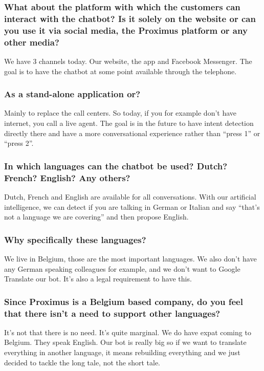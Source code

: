 \begin{appendices}
	\subsubsection{What about the platform with which the customers can interact with the chatbot? Is it solely on the website or can you use it via social media, the Proximus platform or any other media?}
	We have 3 channels today. Our website, the app and Facebook Messenger. The goal is to have the chatbot at some point available through the telephone.
	
	\subsubsection{As a stand-alone application or?}
	Mainly to replace the call centers. So today, if you for example don’t have internet, you call a live agent. The goal is in the future to have intent detection directly there and have a more conversational experience rather than “press 1” or “press 2”.
	
	\subsubsection{In which languages can the chatbot be used? Dutch? French? English? Any others?}
	Dutch, French and English are available for all conversations. With our artificial intelligence, we can detect if you are talking in German or Italian and say “that’s not a language we are covering” and then propose English.
	
	\subsubsection{Why specifically these languages?}
	We live in Belgium, those are the most important languages. We also don’t have any German speaking colleagues for example, and we don’t want to Google Translate our bot. It’s also a legal requirement to have this.
	
	\subsubsection{Since Proximus is a Belgium based company, do you feel that there isn’t a need to support other languages?}
	It’s not that there is no need. It’s quite marginal. We do have expat coming to Belgium. They speak English. Our bot is really big so if we want to translate everything in another language, it means rebuilding everything and we just decided to tackle the long tale, not the short tale.
	

\end{appendices}
